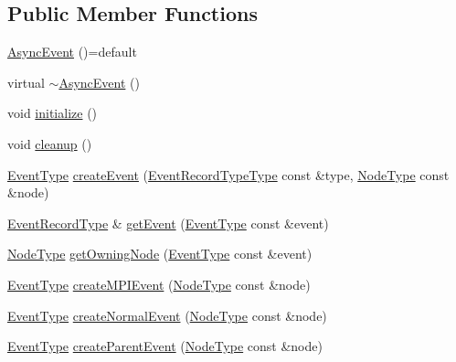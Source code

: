 \subsection*{Public Member Functions}
\begin{DoxyCompactItemize}
\item 
\hyperlink{structvt_1_1event_1_1_async_event_ad9837496e616789010bdbeefa968639d}{Async\+Event} ()=default
\item 
virtual \hyperlink{structvt_1_1event_1_1_async_event_a605a6078d0bcd10467a21464fe143561}{$\sim$\+Async\+Event} ()
\item 
void \hyperlink{structvt_1_1event_1_1_async_event_a765dcd4765e21d545bc529c726d757e1}{initialize} ()
\item 
void \hyperlink{structvt_1_1event_1_1_async_event_abcc9a87b539116f0239686fff07db893}{cleanup} ()
\item 
\hyperlink{namespacevt_a009267401def7ae8bf201892222d060f}{Event\+Type} \hyperlink{structvt_1_1event_1_1_async_event_abc1629d13f9f3391e5e7f9ebc6303265}{create\+Event} (\hyperlink{namespacevt_1_1event_a1ea9fec44d101bf40b8fd786d44ebed9}{Event\+Record\+Type\+Type} const \&type, \hyperlink{namespacevt_a866da9d0efc19c0a1ce79e9e492f47e2}{Node\+Type} const \&node)
\item 
\hyperlink{structvt_1_1event_1_1_async_event_a5b4ef37db6e5962fdc0e6e0e56e74bc1}{Event\+Record\+Type} \& \hyperlink{structvt_1_1event_1_1_async_event_a78e777586ef948a4436b8dcea3c33be4}{get\+Event} (\hyperlink{namespacevt_a009267401def7ae8bf201892222d060f}{Event\+Type} const \&event)
\item 
\hyperlink{namespacevt_a866da9d0efc19c0a1ce79e9e492f47e2}{Node\+Type} \hyperlink{structvt_1_1event_1_1_async_event_a288c3db66bf12de8dc65733b184870c0}{get\+Owning\+Node} (\hyperlink{namespacevt_a009267401def7ae8bf201892222d060f}{Event\+Type} const \&event)
\item 
\hyperlink{namespacevt_a009267401def7ae8bf201892222d060f}{Event\+Type} \hyperlink{structvt_1_1event_1_1_async_event_ae94bb2059c35857a228fd55ab5512272}{create\+M\+P\+I\+Event} (\hyperlink{namespacevt_a866da9d0efc19c0a1ce79e9e492f47e2}{Node\+Type} const \&node)
\item 
\hyperlink{namespacevt_a009267401def7ae8bf201892222d060f}{Event\+Type} \hyperlink{structvt_1_1event_1_1_async_event_aa7c07c129ba54bde5abbe95c543ca352}{create\+Normal\+Event} (\hyperlink{namespacevt_a866da9d0efc19c0a1ce79e9e492f47e2}{Node\+Type} const \&node)
\item 
\hyperlink{namespacevt_a009267401def7ae8bf201892222d060f}{Event\+Type} \hyperlink{structvt_1_1event_1_1_async_event_a9646f211d660d2e991df07b77e5f2cc6}{create\+Parent\+Event} (\hyperlink{namespacevt_a866da9d0efc19c0a1ce79e9e492f47e2}{Node\+Type} const \&node)

\end{DoxyCompactItemize}
